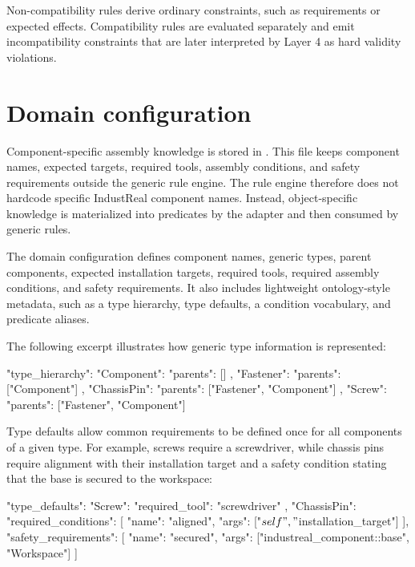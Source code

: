 Non-compatibility rules derive ordinary constraints, such as requirements or expected effects. Compatibility rules are evaluated separately and emit incompatibility constraints that are later interpreted by Layer 4 as hard validity violations.

\section{Domain configuration}
\label{sec:implementation-domain-config}

Component-specific assembly knowledge is stored in . This file keeps component names, expected targets, required tools, assembly conditions, and safety requirements outside the generic rule engine. The rule engine therefore does not hardcode specific IndustReal component names. Instead, object-specific knowledge is materialized into predicates by the adapter and then consumed by generic rules.

The domain configuration defines component names, generic types, parent components, expected installation targets, required tools, required assembly conditions, and safety requirements. It also includes lightweight ontology-style metadata, such as a type hierarchy, type defaults, a condition vocabulary, and predicate aliases.

The following excerpt illustrates how generic type information is represented:

\begin{Code}
"type_hierarchy": {
  "Component": {
    "parents": []
  },
  "Fastener": {
    "parents": ["Component"]
  },
  "ChassisPin": {
    "parents": ["Fastener", "Component"]
  },
  "Screw": {
    "parents": ["Fastener", "Component"]
  }
}
\end{Code}

Type defaults allow common requirements to be defined once for all components of a given type. For example, screws require a screwdriver, while chassis pins require alignment with their installation target and a safety condition stating that the base is secured to the workspace:

\begin{Code}
"type_defaults": {
  "Screw": {
    "required_tool": "screwdriver"
  },
  "ChassisPin": {
    "required_conditions": [
      {
        "name": "aligned",
        "args": ["$self", "$installation_target"]
      }
    ],
    "safety_requirements": [
      {
        "name": "secured",
        "args": ["industreal_component::base", "Workspace"]
      }
    ]
  }
}
\end{Code}

